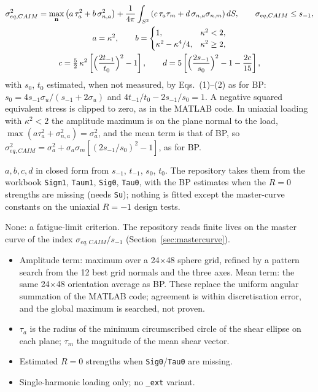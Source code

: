 \begin{gather}
\sigma_{eq,CAIM}^2=\max_{\mathbf n}\left(a\,\tau_a^2+b\,\sigma_{n,a}^2\right)
+\frac{1}{4\pi}\int_{S^2}\left(c\,\tau_a\tau_m+d\,\sigma_{n,a}\sigma_{n,m}\right)dS,
\qquad \sigma_{eq,CAIM}\le s_{-1},
\label{eq:caim-main}\\
a=\kappa^2,\qquad
b=\begin{cases}1, & \kappa^2<2,\\ \kappa^2-\kappa^4/4, & \kappa^2\ge2,\end{cases}
\label{eq:caim-ab}\\
c=\tfrac52\,\kappa^2\left[\Bigl(\frac{2t_{-1}}{t_0}\Bigr)^2-1\right],\qquad
d=5\left[\Bigl(\frac{2s_{-1}}{s_0}\Bigr)^2-1-\frac{2c}{15}\right],
\label{eq:caim-cd}
\end{gather}
with $s_0$, $t_0$ estimated, when not measured, by Eqs.~(1)--(2) as for BP:
$s_0=4s_{-1}\sigma_u/(s_{-1}+2\sigma_u)$ and $4t_{-1}/t_0-2s_{-1}/s_0=1$. A negative squared
equivalent stress is clipped to zero, as in the MATLAB code. In uniaxial loading with $\kappa^2<2$
the amplitude maximum is on the plane normal to the load, $\max(a\tau_a^2+\sigma_{n,a}^2)=\sigma_a^2$,
and the mean term is that of BP, so
$\sigma_{eq,CAIM}^2=\sigma_a^2+\sigma_a\sigma_m[(2s_{-1}/s_0)^2-1]$, as for BP.

 $a,b,c,d$ in closed form from $s_{-1}$, $t_{-1}$, $s_0$, $t_0$. The
repository takes them from the workbook \texttt{Sigm1}, \texttt{Taum1}, \texttt{Sig0},
\texttt{Tau0}, with the BP estimates when the $R=0$ strengths are missing (needs \texttt{Su});
nothing is fitted except the master-curve constants on the uniaxial $R=-1$ design tests.

 None: a fatigue-limit criterion. The repository reads finite lives on the master curve
of the index $\sigma_{eq,CAIM}/s_{-1}$ (Section~\ref{sec:mastercurve}).

\begin{itemize}
\item Amplitude term: maximum over a 24$\times$48 sphere grid, refined by a pattern search from the 12
  best grid normals and the three axes. Mean term: the same 24$\times$48 orientation average as BP.
  These replace the uniform angular summation of the MATLAB code; agreement is within
  discretisation error, and the global maximum is searched, not proven.
\item $\tau_a$ is the radius of the minimum circumscribed circle of the shear ellipse on each plane;
  $\tau_m$ the magnitude of the mean shear vector.
\item Estimated $R=0$ strengths when \texttt{Sig0}/\texttt{Tau0} are missing.
\item Single-harmonic loading only; no \texttt{\_ext} variant.
\end{itemize}


